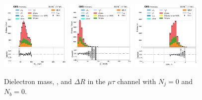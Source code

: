 \begin{figure}[htb!]
    \centering
    \includegraphics[width=0.3\textwidth]{chapters/Appendix/sectionPlots/figures/data_mc_overlays/mutau_2016_cat_eq1_eq0_signal_linear_lepton_dilepton1_mass}
    \includegraphics[width=0.3\textwidth]{chapters/Appendix/sectionPlots/figures/data_mc_overlays/mutau_2016_cat_eq1_eq0_signal_linear_lepton_dilepton1_pt}
    \includegraphics[width=0.3\textwidth]{chapters/Appendix/sectionPlots/figures/data_mc_overlays/mutau_2016_cat_eq1_eq0_signal_linear_lepton_dilepton1_delta_r}
    \caption{Dielectron mass, \pt, and $\Delta R$ in the $\mu\tau$ channel
    with $N_{j} = 0$ and $N_{b} = 0$.}
    \label{fig:mutau_2_dilepton}
\end{figure}

